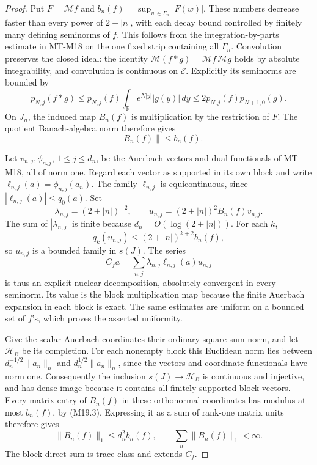 \begin{proof}
Put \(F=\mathcal Mf\) and \(b_n(f)=\sup_{w\in\Gamma_n}|F(w)|\).
These numbers decrease faster than every power of \(2+|n|\),
with each decay bound controlled by finitely many defining
seminorms of \(f\). This follows from the integration-by-parts
estimate in MT-M18 on the one fixed strip containing all
\(\Gamma_n\). Convolution preserves the closed ideal: the
identity \(\mathcal M(f*g)=\mathcal Mf\,\mathcal Mg\) holds
by absolute integrability, and convolution is continuous on
\(\mathcal E\). Explicitly its seminorms are bounded by
\[
 p_{N,j}(f*g)
 \le p_{N,j}(f)\int_{\mathbb R}e^{N|y|}|g(y)|\,dy
 \le 2p_{N,j}(f)p_{N+1,0}(g).
\]
On \(J_n\), the induced map \(B_n(f)\) is multiplication by
the restriction of \(F\). The quotient Banach-algebra norm
therefore gives
\[
                      \|B_n(f)\|\le b_n(f).            \tag{M19.3}
\]

Let \(v_{n,j},\phi_{n,j}\), \(1\le j\le d_n\), be the
Auerbach vectors and dual functionals of MT-M18, all of norm
one. Regard each vector as supported in its own block and
write \(\ell_{n,j}(a)=\phi_{n,j}(a_n)\). The family
\(\ell_{n,j}\) is equicontinuous, since
\(|\ell_{n,j}(a)|\le q_0(a)\). Set
\[
 \lambda_{n,j}=(2+|n|)^{-2},\qquad
 u_{n,j}=(2+|n|)^2 B_n(f)v_{n,j}.
\]
The sum of \(|\lambda_{n,j}|\) is finite because
\(d_n=O(\log(2+|n|))\). For each \(k\),
\[
 q_k(u_{n,j})\le(2+|n|)^{k+2}b_n(f),
\]
so \(u_{n,j}\) is a bounded family in \(s(J)\). The series
\[
 C_f a=\sum_{n,j}\lambda_{n,j}\ell_{n,j}(a)u_{n,j}       \tag{M19.4}
\]
is thus an explicit nuclear decomposition, absolutely convergent
in every seminorm. Its value is the block multiplication map
because the finite Auerbach expansion in each block is exact.
The same estimates are uniform on a bounded set of \(f\)'s,
which proves the asserted uniformity.

Give the scalar Auerbach coordinates their ordinary square-sum
norm, and let \(\mathcal H_B\) be its completion. For each
nonempty block this Euclidean norm lies between
\(d_n^{-1/2}\|a_n\|_n\) and
\(d_n^{1/2}\|a_n\|_n\), since the vectors and coordinate
functionals have norm one. Consequently the inclusion
\(s(J)\to\mathcal H_B\) is continuous and injective, and
has dense image because it contains all finitely supported
block vectors. Every matrix entry of \(B_n(f)\) in these
orthonormal coordinates has modulus at most \(b_n(f)\),
by (M19.3). Expressing it as a sum of rank-one matrix units
therefore gives
\[
       \|B_n(f)\|_1\le d_n^2b_n(f),\qquad
       \sum_n\|B_n(f)\|_1<\infty.                     \tag{M19.5}
\]
The block direct sum is trace class and extends \(C_f\).


\end{proof}
